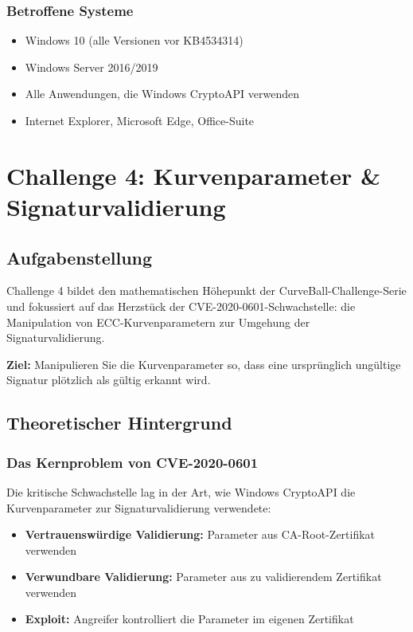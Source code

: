 \documentclass{article}
\begin{document}
\subsubsection{Betroffene Systeme}

\begin{itemize}
    \item Windows 10 (alle Versionen vor KB4534314)
    \item Windows Server 2016/2019
    \item Alle Anwendungen, die Windows CryptoAPI verwenden
    \item Internet Explorer, Microsoft Edge, Office-Suite
\end{itemize}

\section{Challenge 4: Kurvenparameter \& Signaturvalidierung}

\subsection{Aufgabenstellung}

Challenge 4 bildet den mathematischen Höhepunkt der CurveBall-Challenge-Serie und fokussiert auf das Herzstück der CVE-2020-0601-Schwachstelle: die Manipulation von ECC-Kurvenparametern zur Umgehung der Signaturvalidierung.

\textbf{Ziel:} Manipulieren Sie die Kurvenparameter so, dass eine ursprünglich ungültige Signatur plötzlich als gültig erkannt wird.

\subsection{Theoretischer Hintergrund}

\subsubsection{Das Kernproblem von CVE-2020-0601}

Die kritische Schwachstelle lag in der Art, wie Windows CryptoAPI die Kurvenparameter zur Signaturvalidierung verwendete:

\begin{itemize}
    \item \textbf{Vertrauenswürdige Validierung:} Parameter aus CA-Root-Zertifikat verwenden
    \item \textbf{Verwundbare Validierung:} Parameter aus zu validierendem Zertifikat verwenden
    \item \textbf{Exploit:} Angreifer kontrolliert die Parameter im eigenen Zertifikat
\end{itemize}
\end{document}
